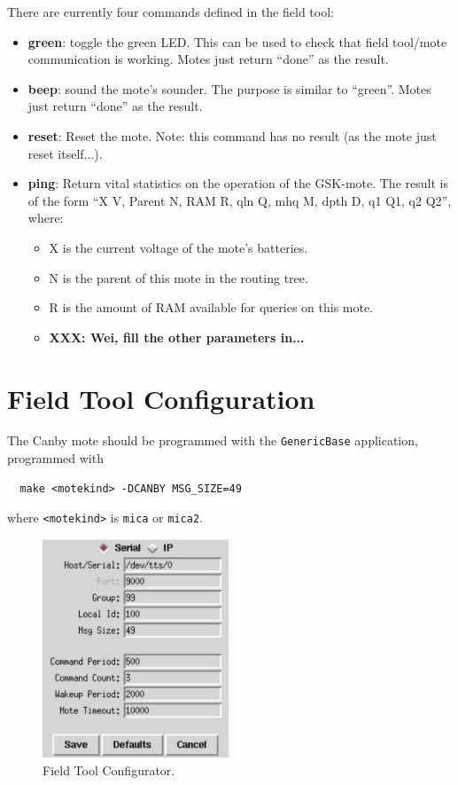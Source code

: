 \documentclass{article}
\begin{document}
There are currently four commands defined in the field tool:
\begin{itemize}
\item {\bf green}: toggle the green LED. This can be used to check that
field tool/mote communication is working. Motes just return ``done'' as the
result.
\item {\bf beep}: sound the mote's sounder. The purpose is similar to
``green''. Motes just return ``done'' as the result.
\item {\bf reset}: Reset the mote. Note: this command has no result (as the
mote just reset itself...).
\item {\bf ping}: Return vital statistics on the operation of the GSK-mote.
The result is of the form ``X V, Parent N, RAM R, qln Q, mhq M, dpth D, q1 Q1, q2 Q2'', where:
\begin{itemize}
\item X is the current voltage of the mote's batteries.
\item N is the parent of this mote in the routing tree.
\item R is the amount of RAM available for queries on this mote.
\item {\bf XXX: Wei, fill the other parameters in...}
\end{itemize}
\end{itemize}

\section{Field Tool Configuration}
\label{sec:config}

The Canby mote should be programmed with the {\tt GenericBase} application,
programmed with
\begin{verbatim}
  make <motekind> -DCANBY MSG_SIZE=49
\end{verbatim}
where {\tt <motekind>} is {\tt mica} or {\tt mica2}.

\begin{figure}[t]
\begin{center}
\includegraphics[width=2.2in]{./config.pdf}
\end{center}
\caption{Field Tool Configurator.}
\label{fig:configview}
\end{figure}
\end{document}
